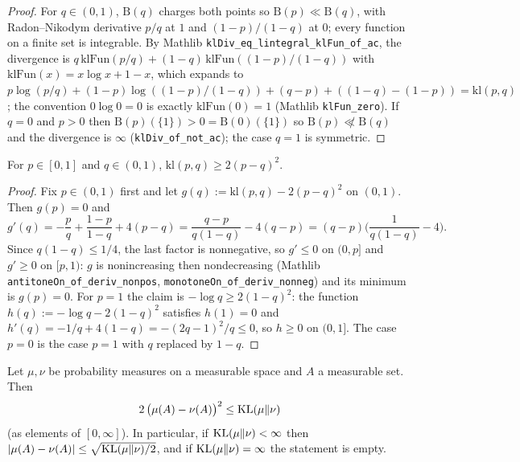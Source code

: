 \begin{proof}
\leanok
For $q \in (0,1)$, $\mathrm{B}(q)$ charges both points so $\mathrm{B}(p) \ll \mathrm{B}(q)$, with
Radon--Nikodym derivative $p/q$ at $1$ and $(1-p)/(1-q)$ at $0$; every function on a finite set is
integrable. By Mathlib \texttt{klDiv\_eq\_lintegral\_klFun\_of\_ac}, the divergence is
$q\,\mathrm{klFun}(p/q) + (1-q)\,\mathrm{klFun}((1-p)/(1-q))$ with
$\mathrm{klFun}(x) = x\log x + 1 - x$, which expands to
$p\log(p/q) + (1-p)\log((1-p)/(1-q)) + (q - p) + ((1-q) - (1-p)) = \mathrm{kl}(p,q)$; the
convention $0\log 0 = 0$ is exactly $\mathrm{klFun}(0) = 1$ (Mathlib \texttt{klFun\_zero}). If
$q = 0$ and $p > 0$ then $\mathrm{B}(p)(\{1\}) > 0 = \mathrm{B}(0)(\{1\})$ so $\mathrm{B}(p)
\not\ll \mathrm{B}(q)$ and the divergence is $\infty$ (\texttt{klDiv\_of\_not\_ac}); the case
$q = 1$ is symmetric.
\end{proof}

\begin{lemma}\label{lem:kl_bernoulli_pinsker}
\leanok
{}
For $p \in [0,1]$ and $q \in (0,1)$, $\mathrm{kl}(p,q) \ge 2(p-q)^2$.
\end{lemma}

\begin{proof}
\leanok
{}
Fix $p \in (0,1)$ first and let $g(q) := \mathrm{kl}(p,q) - 2(p-q)^2$ on $(0,1)$. Then
$g(p) = 0$ and
\[
  g'(q) = -\frac{p}{q} + \frac{1-p}{1-q} + 4(p-q) = \frac{q-p}{q(1-q)} - 4(q-p)
  = (q-p)\Big(\frac{1}{q(1-q)} - 4\Big).
\]
Since $q(1-q) \le 1/4$, the last factor is nonnegative, so $g' \le 0$ on $(0,p]$ and $g' \ge 0$
on $[p,1)$: $g$ is nonincreasing then nondecreasing (Mathlib
\texttt{antitoneOn\_of\_deriv\_nonpos}, \texttt{monotoneOn\_of\_deriv\_nonneg}) and its minimum
is $g(p) = 0$. For $p = 1$ the claim is $-\log q \ge 2(1-q)^2$: the function
$h(q) := -\log q - 2(1-q)^2$ satisfies $h(1) = 0$ and $h'(q) = -1/q + 4(1-q) = -(2q-1)^2/q \le 0$,
so $h \ge 0$ on $(0,1]$. The case $p = 0$ is the case $p = 1$ with $q$ replaced by $1-q$.
\end{proof}

\begin{lemma}\label{lem:pinsker}
\leanok
{}
Let $\mu, \nu$ be probability measures on a measurable space and $A$ a measurable set. Then
\[
  2\,\big(\mu(A) - \nu(A)\big)^2 \le \mathrm{KL}(\mu\|\nu)
\]
(as elements of $[0,\infty]$). In particular, if $\mathrm{KL}(\mu\|\nu) < \infty$ then
$\lvert \mu(A) - \nu(A) \rvert \le \sqrt{\mathrm{KL}(\mu\|\nu)/2}$, and if $\mathrm{KL}(\mu\|\nu) = \infty$ the
statement is empty.
\end{lemma}

